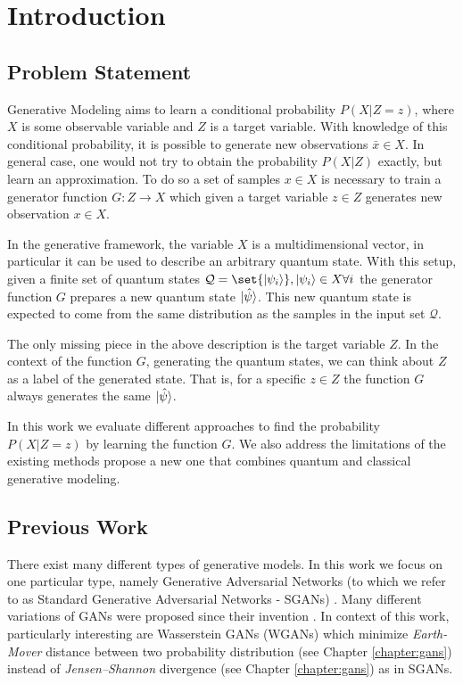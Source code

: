 \chapter{Introduction} \label{chapter:introduction}
\section{Problem Statement}
Generative Modeling aims to learn a conditional probability $P(X|Z = z)$, where $X$ is some observable variable and $Z$ is a target variable. With knowledge of this conditional probability, it is possible to generate new observations $\bar{x} \in X$. In general case, one would not try to obtain the probability $P(X|Z)$ exactly, but learn an approximation. To do so a set of samples $x \in X$ is necessary to train a generator function $G: Z \to X$ which given a target variable $z \in Z$ generates new observation $x \in X$. 

In the generative framework, the variable $X$ is a multidimensional vector, in particular it can be used to describe an arbitrary quantum state. With this setup, given a finite set of quantum states $\mathcal{Q} = \set{\ket{\psi_i}}, \ket{\psi_i} \in X \forall i$ the generator function $G$ prepares a new quantum state $\lvert\hat{\psi}\rangle$. This new quantum state is expected to come from the same distribution as the samples in the input set $\mathcal{Q}$.

The only missing piece in the above description is the target variable $Z$. In
the context of the function $G$, generating the quantum states, we can think
about $Z$ as a label of the generated state. That is, for a specific $z \in Z$
the function $G$ always generates the same $\lvert\hat{\psi}\rangle$.

In this work we evaluate different approaches to find the probability $P(X|Z =
z)$ by learning the function $G$. We also address the limitations of the
existing methods propose a new one that combines quantum and classical
generative modeling.
\section{Previous Work}
There exist many different types of generative models. In this work we focus on
one particular type, namely Generative Adversarial Networks (to which we refer
to as Standard Generative Adversarial Networks - SGANs)
\cite{goodfellow2014generative}. Many different variations of GANs were proposed
since their invention
\cite{mirza2014conditional}\cite{karras2019stylebased}\cite{radford2016unsupervised}.
In context of this work, particularly interesting are Wasserstein GANs
(WGANs)\cite{arjovsky2017wasserstein} which minimize \textit{Earth-Mover} distance
between two probability distribution (see Chapter \ref{chapter:gans}) instead of
\textit{Jensen–Shannon} divergence (see Chapter \ref{chapter:gans}) as in SGANs.

